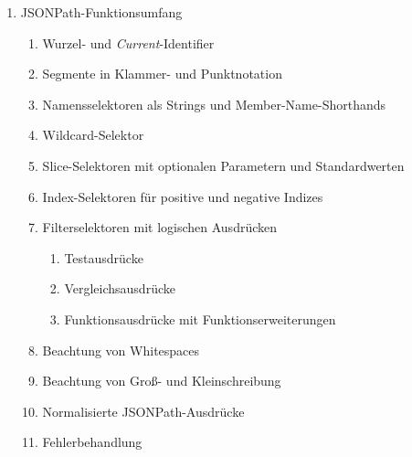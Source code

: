 \documentclass[oneside]{ausarbeitung}
\begin{document}
\begin{enumerate}
	\item JSONPath-Funktionsumfang
	\begin{enumerate}
		\item Wurzel- und \textit{Current}-Identifier
		\item Segmente in Klammer- und Punktnotation
		\item Namensselektoren als Strings und Member-Name-Shorthands
		\item Wildcard-Selektor
		\item Slice-Selektoren mit optionalen Parametern und Standardwerten
		\item Index-Selektoren für positive und negative Indizes
		\item Filterselektoren mit logischen Ausdrücken
		\begin{enumerate}
			\item Testausdrücke
			\item Vergleichsausdrücke
			\item Funktionsausdrücke mit Funktionserweiterungen
		\end{enumerate}
		\item Beachtung von Whitespaces
		\item Beachtung von Groß- und Kleinschreibung
		\item Normalisierte JSONPath-Ausdrücke
		\item Fehlerbehandlung
	\end{enumerate}
	

\end{enumerate}
\end{document}
